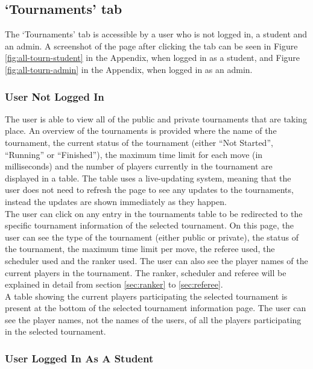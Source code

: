 \documentclass[a4paper, 11pt]{report}
\begin{document}
\subsection{`Tournaments' tab}
\label{sec:impl-tab-tournaments}

The `Tournaments' tab is accessible by a user who is not logged in, a student
and an admin. A screenshot of the page after clicking the tab can be seen in
Figure \ref{fig:all-tourn-student} in the Appendix, when logged in as a student,
and Figure \ref{fig:all-tourn-admin} in the Appendix, when logged in as an
admin.

\subsubsection*{User Not Logged In}

The user is able to view all of the public and private tournaments that are
taking place. An overview of the tournaments is provided where the name of the
tournament, the current status of the tournament (either ``Not Started'',
``Running'' or ``Finished''), the maximum time limit for each move (in milliseconds)
and the number of players currently in the tournament are displayed in a table.
The table uses a live-updating system, meaning that the user does not need to
refresh the page to see any updates to the tournaments, instead the updates are
shown immediately as they happen. \\

The user can click on any entry in the tournaments table to be redirected to
the specific tournament information of the selected tournament. On this page, the
user can see the type of the tournament (either public or private), the status
of the tournament, the maximum time limit per move, the referee used, the scheduler
used and the ranker used. The user can also see the player names of the current
players in the tournament. The ranker, scheduler and referee will be explained
in detail from section \ref{sec:ranker} to \ref{sec:referee}. \\

A table showing the current players participating the selected tournament is
present at the bottom of the selected tournament information page. The user can
see the player names, not the names of the users, of all the players participating
in the selected tournament.

\subsubsection*{User Logged In As A Student}
\end{document}
